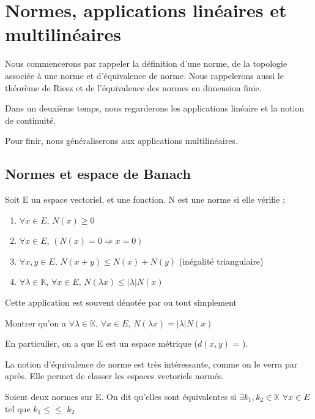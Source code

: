 \chapter{Normes, applications linéaires et multilinéaires}

Nous commencerons par rappeler la définition d'une norme, de la topologie
associée à une norme et d'équivalence de norme. Nous rappelerons aussi le
théorème de Riesz et de l'équivalence des normes en dimension finie.

Dans un deuxième temps, nous regarderons les applications linéaire et la notion
de continuité.

Pour finir, nous généraliserons aux applications multilinéaires.

\section{Normes et espace de Banach}

\begin{definition}
    Soit E un espace vectoriel, et  une fonction.
    N est une norme si elle vérifie :
    \begin{enumerate}
        \item $\forall x \in E$, $N(x) \geq 0$
        \item $\forall x \in E$, $(N(x) = 0 \Rightarrow x = 0)$
        \item $\forall x, y \in E$, $N(x + y) \leq N(x) + N(y)$ (inégalité
            triangulaire)
        \item $\forall \lambda \in \mathbb{K}$, $\forall x \in E$, $N(\lambda x)
            \leq |\lambda| N(x)$
    \end{enumerate}
    Cette application est souvent dénotée par  ou tout simplement
\end{definition}

\begin{exercice}
    Montrer qu'on a
    $\forall \lambda \in \mathbb{K}$, $\forall x \in E$, $N(\lambda x) =
    |\lambda| N(x)$
\end{exercice}

En particulier, on a que E est un espace métrique ($d(x, y)$ = ).

La notion d'équivalence de norme est très intéressante, comme on le verra par
après. Elle permet de classer les espaces vectoriels normés.

\begin{definition}
    Soient deux normes   sur E. On dit
	qu'elles sont équivalentes si $\exists k_{1}, k_{2} \in \mathbb{K}$ $\forall
	x \in E$ tel que $k_{1}$$\leq$$\leq$
	$k_{2}$
\end{definition}

